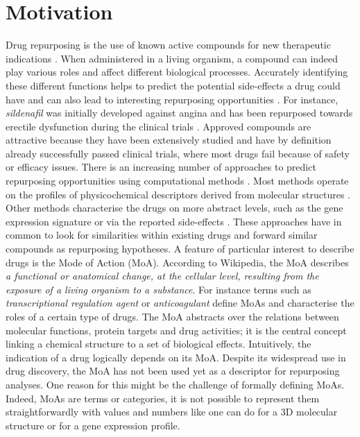 \documentclass{bioinfo}
\begin{document}
\section{Motivation}

Drug repurposing is the use of known active compounds for new therapeutic indications \citep{Sanseau01072011}. 
When administered in a living organism, a compound can indeed play various roles and affect different biological processes. 
Accurately identifying these different functions helps to predict the potential side-effects a drug could have and can also lead to 
interesting repurposing opportunities \citep{Medina-Franco2013}. For instance, \emph{sildenafil} was initially developed 
against angina and has been repurposed towards erectile dysfunction during the clinical trials \citep{Ashburn2004}. Approved compounds are 
attractive because they have been extensively studied and have by definition already successfully passed clinical trials, where 
most drugs fail because of safety or efficacy issues.
There is an increasing number of approaches to predict repurposing opportunities using computational methods \citep{Sanseau01072011}. Most 
methods operate on the profiles of physicochemical descriptors derived from molecular structures \citep{Haupt2011}. Other methods characterise 
the drugs on more abstract levels, such as the gene expression signature \citep{Iorio2010} or 
via the reported side-effects \citep{Campillos2008}. 
These approaches 
have in common to look for similarities within existing drugs and forward similar compounds as repurposing hypotheses.
A feature of particular interest to describe drugs is the Mode of Action (MoA). According to Wikipedia, 
the MoA describes \emph{a functional or anatomical change, 
at the cellular level, resulting from the exposure of a living organism to a substance}. For instance 
terms such as \emph{transcriptional regulation agent} or \emph{anticoagulant} define MoAs and characterise the 
roles of a certain type of drugs. The 
MoA abstracts over the relations between molecular functions, protein targets and drug activities; it is the central concept linking a 
chemical structure to a set of biological effects. Intuitively, the indication of a drug logically depends on its MoA.
Despite its widespread use in drug discovery, the MoA has not been used yet as a descriptor for repurposing analyses. One reason for this 
might be the challenge of formally defining MoAs. Indeed, MoAs are terms or categories, it is not possible to represent 
them straightforwardly with values and numbers like one can do for a 3D molecular structure or for a gene expression profile. 
\end{document}
